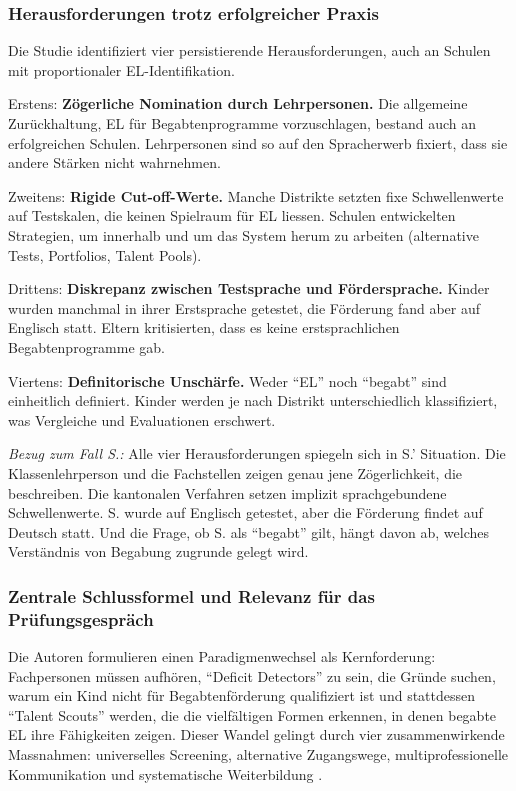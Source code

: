 \documentclass[ngerman, a4paper]{article}
\begin{document}
\subsubsection*{Herausforderungen trotz erfolgreicher Praxis}

Die Studie identifiziert vier persistierende Herausforderungen, auch an
Schulen mit proportionaler EL-Identifikation.

Erstens: \textbf{Zögerliche Nomination durch Lehrpersonen.} Die allgemeine
Zurückhaltung, EL für Begabtenprogramme vorzuschlagen, bestand auch an
erfolgreichen Schulen. Lehrpersonen sind so auf den Spracherwerb fixiert,
dass sie andere Stärken nicht wahrnehmen.

Zweitens: \textbf{Rigide Cut-off-Werte.} Manche Distrikte setzten fixe
Schwellenwerte auf Testskalen, die keinen Spielraum für EL liessen.
Schulen entwickelten Strategien, um innerhalb und um das System herum zu
arbeiten (alternative Tests, Portfolios, Talent Pools).

Drittens: \textbf{Diskrepanz zwischen Testsprache und Fördersprache.}
Kinder wurden manchmal in ihrer Erstsprache getestet, die Förderung fand
aber auf Englisch statt. Eltern kritisierten, dass es keine
erstsprachlichen Begabtenprogramme gab.

Viertens: \textbf{Definitorische Unschärfe.} Weder \enquote{EL} noch
\enquote{begabt} sind einheitlich definiert. Kinder werden je nach
Distrikt unterschiedlich klassifiziert, was Vergleiche und Evaluationen
erschwert.

\textit{Bezug zum Fall S.:} Alle vier Herausforderungen spiegeln sich in
S.' Situation. Die Klassenlehrperson und die Fachstellen zeigen genau jene
Zögerlichkeit, die \textcite{gubbins2020promising} beschreiben. Die
kantonalen Verfahren setzen implizit sprachgebundene Schwellenwerte. S.
wurde auf Englisch getestet, aber die Förderung findet auf Deutsch statt.
Und die Frage, ob S. als \enquote{begabt} gilt, hängt davon ab, welches
Verständnis von Begabung zugrunde gelegt wird.

\subsubsection*{Zentrale Schlussformel und Relevanz für das
  Prüfungsgespräch}

Die Autoren formulieren einen Paradigmenwechsel als Kernforderung:
Fachpersonen müssen aufhören, \enquote{Deficit Detectors} zu sein, die
Gründe suchen, warum ein Kind nicht für Begabtenförderung qualifiziert
ist und stattdessen \enquote{Talent Scouts} werden, die die vielfältigen
Formen erkennen, in denen begabte EL ihre Fähigkeiten zeigen. Dieser
Wandel gelingt durch vier zusammenwirkende Massnahmen: universelles
Screening, alternative Zugangswege, multiprofessionelle Kommunikation und
systematische Weiterbildung \parencite[S.\,23--31]{gubbins2020promising}.
\end{document}
